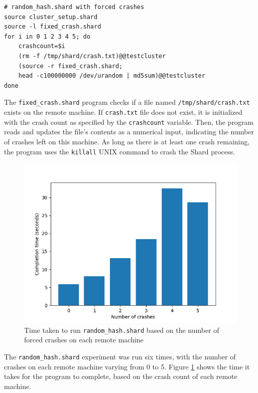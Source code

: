 \documentclass[oneside]{report}
\begin{document}
\begin{minipage}[c]{\textwidth-15pt}
  \begin{lstlisting}[language=Shard]
# random_hash.shard with forced crashes
source cluster_setup.shard
source -l fixed_crash.shard
for i in 0 1 2 3 4 5; do
    crashcount=$i
    (rm -f /tmp/shard/crash.txt)@@testcluster
    (source -r fixed_crash.shard;
    head -c100000000 /dev/urandom | md5sum)@@testcluster
done
\end{lstlisting}
  \smallskip
\end{minipage}

The \texttt{fixed\_crash.shard} program checks if a file named \texttt{/tmp/shard/crash.txt} exists on the remote machine.
If \texttt{crash.txt} file does not exist, it is initialized with the crash count as specified by the \texttt{crashcount} variable.
Then, the program reads and updates the file's contents as a numerical input, indicating the number of crashes left on this machine.
As long as there is at least one crash remaining, the program uses the \texttt{killall} UNIX command to crash the Shard process.

\begin{figure}[h]
  \begin{center}
    \includegraphics[scale=0.9]{img/experiments/e5_1620960581241.png}
    \caption{Time taken to run \texttt{random\_hash.shard} based on the number of forced crashes on each remote machine}
    \label{fig:crashhash}
  \end{center}
\end{figure}

The \texttt{random\_hash.shard} experiment was run six times, with the number of crashes on each remote machine varying from 0 to 5.
Figure \ref{fig:crashhash} shows the time it takes for the program to complete, based on the crash count of each remote machine.
\end{document}
